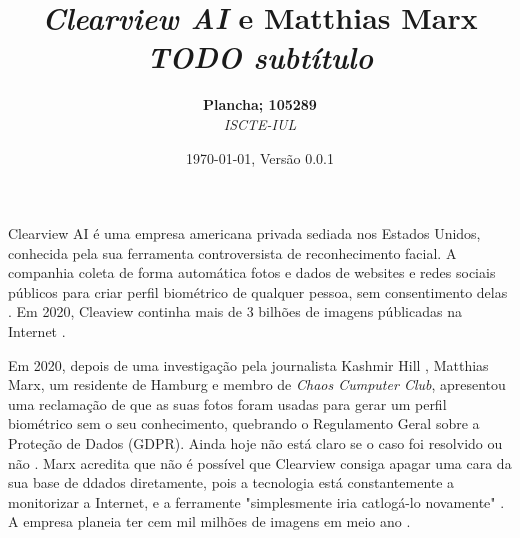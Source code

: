 \documentclass[portuguese, 12pt]{../diazessay}
\title{\textbf{\textit{Clearview AI} e Matthias Marx} \\ {\Large\itshape TODO subtítulo}}
\author{\textbf{Plancha; 105289} \\ \textit{ISCTE-IUL}}
\date{\today , Versão 0.0.1}
\begin{document}
\maketitle
Clearview AI é uma empresa americana privada sediada nos Estados Unidos, conhecida pela sua ferramenta controversista \cite{nytClearview, CVBan} de reconhecimento facial. A companhia coleta de forma automática fotos e dados de websites e redes sociais públicos para criar perfil biométrico de qualquer pessoa, sem consentimento delas \cite{EUpresp}. Em 2020, Cleaview continha mais de 3 bilhões de imagens públicadas na Internet \cite{EUpresp}.

Em 2020, depois de uma investigação pela journalista Kashmir Hill \citeyear{nytClearview}, Matthias Marx, um residente de Hamburg e membro de \textit{Chaos Cumputer Club}\cite{LegalComp}, apresentou uma reclamação de que as suas fotos foram usadas para gerar um perfil biométrico sem o seu conhecimento, quebrando o Regulamento Geral sobre a Proteção de Dados (GDPR). Ainda hoje não está claro se o caso foi resolvido ou não \cite{wired}. Marx acredita que não é possível que Clearview consiga apagar uma cara da sua base de ddados diretamente, pois a tecnologia está constantemente a monitorizar a Internet, e a ferramente "simplesmente iria catlogá-lo novamente" \cite{wired}. A empresa planeia ter cem mil milhões de imagens em meio ano \cite{expansion}.


\printbibliography[title=Referências]
\end{document}
